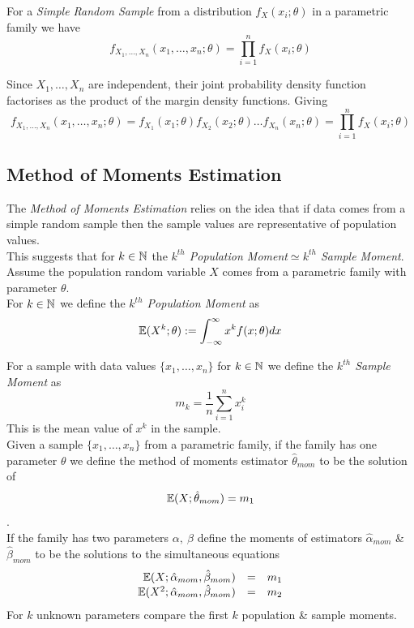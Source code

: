 \documentclass[11pt,a4paper]{article}
\begin{document}
For a \textit{Simple Random Sample} from a distribution $f_X(x_i;\theta)$ in a parametric family we have
$$f_{X_1,\dots,X_n}(x_1,\dots,x_n;\theta)=\prod_{i=1}^n f_X(x_i;\theta)$$

Since $X_1,\dots,X_n$ are independent, their joint probability density function factorises as the product of the margin density functions. Giving %
$$f_{X_1,\dots,X_n}(x_1,\dots,x_n;\theta)=f_{X_1}(x_1;\theta)f_{X_2}(x_2;\theta)\dots f_{X_n}(x_n;\theta)=\prod_{i=1}^n f_X(x_i;\theta)$$

\subsection{Method of Moments Estimation}

The \textit{Method of Moments Estimation} relies on the idea that if data comes from a simple random sample then the sample values are representative of population values.\\
This suggests that for $k\in\mathbb{N}$ the \textit{$k^{th}$ Population Moment}$\simeq$\textit{$k^{th}$ Sample Moment}.\\

Assume the population random variable $X$ comes from a parametric family with parameter $\theta$.\\
For $k\in\mathbb{N}$ we define the \textit{$k^{th}$ Population Moment} as
$$\mathbb{E}(X^k;\theta):=\int_{-\infty}^{\infty}x^kf(x;\theta)dx$$

For a sample with data values $\{x_1,\dots,x_n\}$ for $k\in\mathbb{N}$ we define the \textit{$k^{th}$ Sample Moment} as
$$m_k=\frac{1}{n}\sum_{i=1}^nx_i^k$$
\nb This is the mean value of $x^k$ in the sample.\\

Given a sample $\{x_1,\dots,x_n\}$ from a parametric family, if the family has one parameter $\theta$ we define the method of moments estimator $\hat{\theta}_{mom}$ to be the solution of
$$\mathbb{E}(X;\hat{\theta}_{mom})=m_1$$.\\
If the family has two parameters $\alpha,\ \beta$ define the moments of estimators $\hat{\alpha}_{mom}$ \& $\hat{\beta}_{mom}$ to be the solutions to the simultaneous equations
\[\begin{array}{rcl}
\mathbb{E}(X;\hat{\alpha}_{mom},\hat{\beta}_{mom})&=&m_1\\
\mathbb{E}(X^2;\hat{\alpha}_{mom},\hat{\beta}_{mom})&=&m_2
\end{array}\]
\nb For $k$ unknown parameters compare the first $k$ population \& sample moments.\\
\end{document}
